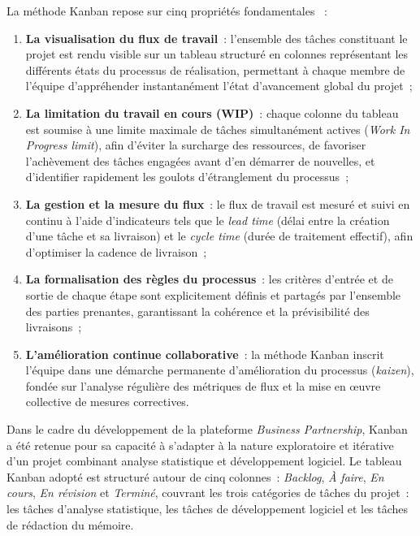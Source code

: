 \documentclass[12pt, a4paper, oneside]{report}
\begin{document}
	La m\'ethode Kanban repose sur cinq propri\'et\'es
	fondamentales \cite{anderson_2010}~:
	
	\begin{enumerate}
		
		\item \textbf{La visualisation du flux de travail}~:
		l'ensemble des t\^aches constituant le projet est rendu
		visible sur un tableau structur\'e en colonnes repr\'esentant
		les diff\'erents \'etats du processus de r\'ealisation,
		permettant \`a chaque membre de l'\'equipe d'appr\'ehender
		instantan\'ement l'\'etat d'avancement global du projet~;
		
		\item \textbf{La limitation du travail en cours (WIP)}~:
		chaque colonne du tableau est soumise \`a une limite
		maximale de t\^aches simultan\'ement actives
		(\textit{Work In Progress limit}), afin d'\'eviter la
		surcharge des ressources, de favoriser l'ach\`evement des
		t\^aches engag\'ees avant d'en d\'emarrer de nouvelles,
		et d'identifier rapidement les goulots d'\'etranglement
		du processus~;
		
		\item \textbf{La gestion et la mesure du flux}~: le flux
		de travail est mesur\'e et suivi en continu \`a l'aide
		d'indicateurs tels que le \textit{lead time} (d\'elai
		entre la cr\'eation d'une t\^ache et sa livraison) et
		le \textit{cycle time} (dur\'ee de traitement effectif),
		afin d'optimiser la cadence de livraison~;
		
		\item \textbf{La formalisation des r\`egles du processus}~:
		les crit\`eres d'entr\'ee et de sortie de chaque \'etape
		sont explicitement d\'efinis et partag\'es par l'ensemble
		des parties prenantes, garantissant la coh\'erence et la
		pr\'evisibilit\'e des livraisons~;
		
		\item \textbf{L'am\'elioration continue collaborative}~:
		la m\'ethode Kanban inscrit l'\'equipe dans une d\'emarche
		permanente d'am\'elioration du processus
		(\textit{kaizen}), fond\'ee sur l'analyse r\'eguli\`ere
		des m\'etriques de flux et la mise en \oe uvre collective
		de mesures correctives.
		
	\end{enumerate}
	
	Dans le cadre du d\'eveloppement de la plateforme
	\textit{Business Partnership}, Kanban a \'et\'e retenue
	pour sa capacit\'e \`a s'adapter \`a la nature exploratoire
	et it\'erative d'un projet combinant analyse statistique
	et d\'eveloppement logiciel. Le tableau Kanban adopt\'e
	est structur\'e autour de cinq colonnes~:
	\textit{Backlog}, \textit{\`A faire},
	\textit{En cours}, \textit{En r\'evision} et
	\textit{Termin\'e}, couvrant les trois cat\'egories de
	t\^aches du projet~: les t\^aches d'analyse statistique,
	les t\^aches de d\'eveloppement logiciel et les t\^aches
	de r\'edaction du m\'emoire.
	
\end{document}
